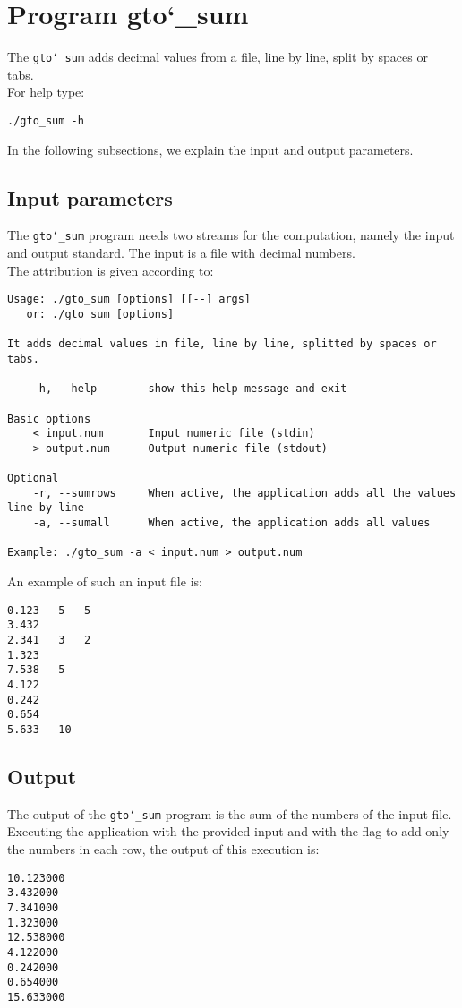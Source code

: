 \section{Program gto\char`_sum}
The \texttt{gto\char`_sum} adds decimal values from a file, line by line, split by spaces or tabs.\\
For help type:
\begin{lstlisting}
./gto_sum -h
\end{lstlisting}
In the following subsections, we explain the input and output parameters.

\subsection*{Input parameters}

The \texttt{gto\char`_sum} program needs two streams for the computation, namely the input and output standard. The input is a file with decimal numbers.\\
The attribution is given according to:
\begin{lstlisting}
Usage: ./gto_sum [options] [[--] args]
   or: ./gto_sum [options]

It adds decimal values in file, line by line, splitted by spaces or tabs.

    -h, --help        show this help message and exit

Basic options
    < input.num       Input numeric file (stdin)
    > output.num      Output numeric file (stdout)

Optional
    -r, --sumrows     When active, the application adds all the values line by line
    -a, --sumall      When active, the application adds all values

Example: ./gto_sum -a < input.num > output.num
\end{lstlisting}
An example of such an input file is:
\begin{lstlisting}
0.123	5	5
3.432
2.341   3   2
1.323
7.538	5
4.122
0.242 
0.654
5.633	10
\end{lstlisting}

\subsection*{Output}
The output of the \texttt{gto\char`_sum} program is the sum of the numbers of the input file.\\
Executing the application with the provided input and with the flag to add only the numbers in each row, the output of this execution is:
\begin{lstlisting}
10.123000
3.432000
7.341000
1.323000
12.538000
4.122000
0.242000
0.654000
15.633000
\end{lstlisting}